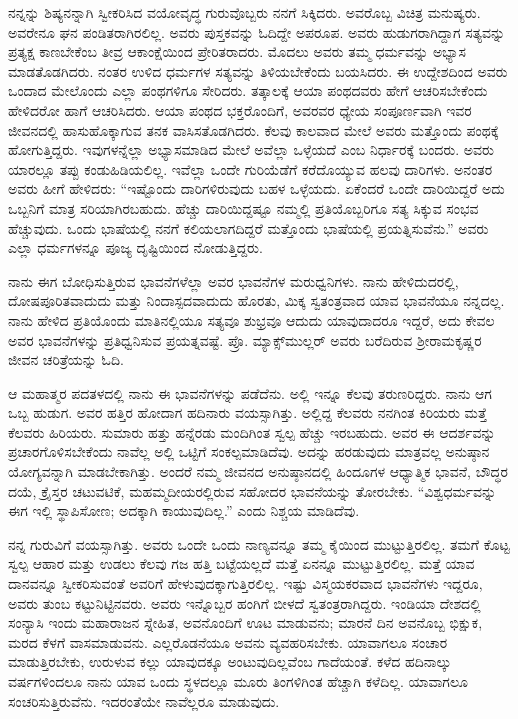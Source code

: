 ನನ್ನನ್ನು ಶಿಷ್ಯನನ್ನಾಗಿ ಸ್ವೀಕರಿಸಿದ ವಯೋವೃದ್ಧ ಗುರುವೊಬ್ಬರು ನನಗೆ ಸಿಕ್ಕಿದರು. ಅವರೊಬ್ಬ ವಿಚಿತ್ರ ಮನುಷ್ಯರು. ಅವರೇನೂ ಘನ ಪಂಡಿತರಾಗಿರಲಿಲ್ಲ. ಅವರು ಪುಸ್ತಕವನ್ನು ಓದಿದ್ದೇ ಅಪರೂಪ. ಅವರು ಹುಡುಗರಾಗಿದ್ದಾಗ ಸತ್ಯವನ್ನು ಪ್ರತ್ಯಕ್ಷ ಕಾಣಬೇಕೆಂಬ ತೀವ್ರ ಆಕಾಂಕ್ಷೆಯಿಂದ ಪ್ರೇರಿತರಾದರು. ಮೊದಲು ಅವರು ತಮ್ಮ ಧರ್ಮವನ್ನು ಅಭ್ಯಾಸ ಮಾಡತೊಡಗಿದರು. ನಂತರ ಉಳಿದ ಧರ್ಮಗಳ ಸತ್ಯವನ್ನು ತಿಳಿಯಬೇಕೆಂದು ಬಯಸಿದರು. ಈ ಉದ್ದೇಶದಿಂದ ಅವರು ಒಂದಾದ ಮೇಲೊಂದು ಎಲ್ಲಾ ಪಂಥಗಳಿಗೂ ಸೇರಿದರು. ತತ್ಕಾಲಕ್ಕೆ ಆಯಾ ಪಂಥದವರು ಹೇಗೆ ಆಚರಿಸಬೇಕೆಂದು ಹೇಳಿದರೋ ಹಾಗೆ ಆಚರಿಸಿದರು. ಆಯಾ ಪಂಥದ ಭಕ್ತರೊಂದಿಗೆ, ಅವರವರ ಧ್ಯೇಯ ಸಂಪೂರ್ಣವಾಗಿ ಇವರ ಜೀವನದಲ್ಲಿ ಹಾಸುಹೊಕ್ಕಾಗುವ ತನಕ ವಾಸಿಸತೊಡಗಿದರು. ಕೆಲವು ಕಾಲವಾದ ಮೇಲೆ ಅವರು ಮತ್ತೊಂದು ಪಂಥಕ್ಕೆ ಹೋಗುತ್ತಿದ್ದರು. ಇವುಗಳನ್ನೆಲ್ಲಾ ಅಭ್ಯಾಸಮಾಡಿದ ಮೇಲೆ ಅವೆಲ್ಲಾ ಒಳ್ಳೆಯದೆ ಎಂಬ ನಿರ್ಧಾರಕ್ಕೆ ಬಂದರು. ಅವರು ಯಾರಲ್ಲೂ ತಪ್ಪು ಕಂಡುಹಿಡಿಯಲಿಲ್ಲ. ಇವೆಲ್ಲಾ ಒಂದೇ ಗುರಿಯೆಡೆಗೆ ಕರೆದೊಯ್ಯುವ ಹಲವು ದಾರಿಗಳು. ಅನಂತರ ಅವರು ಹೀಗೆ ಹೇಳಿದರು: “ಇಷ್ಟೊಂದು ದಾರಿಗಳಿರುವುದು ಬಹಳ ಒಳ್ಳೆಯದು. ಏಕೆಂದರೆ ಒಂದೇ ದಾರಿಯಿದ್ದರೆ ಅದು ಒಬ್ಬನಿಗೆ ಮಾತ್ರ ಸರಿಯಾಗಿರಬಹುದು. ಹೆಚ್ಚು ದಾರಿಯಿದ್ದಷ್ಟೂ ನಮ್ಮಲ್ಲಿ ಪ್ರತಿಯೊಬ್ಬರಿಗೂ ಸತ್ಯ ಸಿಕ್ಕುವ ಸಂಭವ ಹೆಚ್ಚುವುದು. ಒಂದು ಭಾಷೆಯಲ್ಲಿ ನನಗೆ ಕಲಿಯಲಾಗದಿದ್ದರೆ ಮತ್ತೊಂದು ಭಾಷೆಯಲ್ಲಿ ಪ್ರಯತ್ನಿಸುವೆನು.” ಅವರು ಎಲ್ಲಾ ಧರ್ಮಗಳನ್ನೂ ಪೂಜ್ಯ ದೃಷ್ಟಿಯಿಂದ ನೋಡುತ್ತಿದ್ದರು.

ನಾನು ಈಗ ಬೋಧಿಸುತ್ತಿರುವ ಭಾವನೆಗಳೆಲ್ಲಾ ಅವರ ಭಾವನೆಗಳ ಮರುಧ್ವನಿಗಳು. ನಾನು ಹೇಳಿದುದರಲ್ಲಿ, ದೋಷಪೂರಿತವಾದುದು ಮತ್ತು ನಿಂದಾಸ್ಪದವಾದುದು ಹೊರತು, ಮಿಕ್ಕ ಸ್ವತಂತ್ರವಾದ ಯಾವ ಭಾವನೆಯೂ ನನ್ನದಲ್ಲ. ನಾನು ಹೇಳಿದ ಪ್ರತಿಯೊಂದು ಮಾತಿನಲ್ಲಿಯೂ ಸತ್ಯವೂ ಶುಭ್ರವೂ ಆದುದು ಯಾವುದಾದರೂ ಇದ್ದರೆ, ಅದು ಕೇವಲ ಅವರ ಭಾವನೆಗಳನ್ನು ಪ್ರತಿಧ್ವನಿಸುವ ಪ್ರಯತ್ನವಷ್ಟೆ. ಪ್ರೊ. ಮ್ಯಾಕ್ಸ್‌ಮುಲ್ಲರ್ ಅವರು ಬರೆದಿರುವ ಶ‍್ರೀರಾಮಕೃಷ್ಣರ ಜೀವನ ಚರಿತ್ರೆಯನ್ನು ಓದಿ.

ಆ ಮಹಾತ್ಮರ ಪದತಳದಲ್ಲಿ ನಾನು ಈ ಭಾವನೆಗಳನ್ನು ಪಡೆದೆನು. ಅಲ್ಲಿ ಇನ್ನೂ ಕೆಲವು ತರುಣರಿದ್ದರು. ನಾನು ಆಗ ಒಬ್ಬ ಹುಡುಗ. ಅವರ ಹತ್ತಿರ ಹೋದಾಗ ಹದಿನಾರು ವಯಸ್ಸಾಗಿತ್ತು. ಅಲ್ಲಿದ್ದ ಕೆಲವರು ನನಗಿಂತ ಕಿರಿಯರು ಮತ್ತೆ ಕೆಲವರು ಹಿರಿಯರು. ಸುಮಾರು ಹತ್ತು ಹನ್ನೆರಡು ಮಂದಿಗಿಂತ ಸ್ವಲ್ಪ ಹೆಚ್ಚು ಇರಬಹುದು. ಅವರ ಈ ಆದರ್ಶವನ್ನು ಪ್ರಚಾರಗೊಳಿಸಬೇಕೆಂದು ನಾವೆಲ್ಲ ಅಲ್ಲಿ ಒಟ್ಟಿಗೆ ಸಂಕಲ್ಪಮಾಡಿದೆವು. ಅದನ್ನು ಹರಡುವುದು ಮಾತ್ರವಲ್ಲ ಅನುಷ್ಠಾನ ಯೋಗ್ಯವನ್ನಾಗಿ ಮಾಡಬೇಕಾಗಿತ್ತು. ಅಂದರೆ ನಮ್ಮ ಜೀವನದ ಅನುಷ್ಠಾನದಲ್ಲಿ ಹಿಂದೂಗಳ ಆಧ್ಯಾತ್ಮಿಕ ಭಾವನೆ, ಬೌದ್ಧರ ದಯೆ, ಕ್ರೈಸ್ತರ ಚಟುವಟಿಕೆ, ಮಹಮ್ಮದೀಯರಲ್ಲಿರುವ ಸಹೋದರ ಭಾವನೆಯನ್ನು ತೋರಬೇಕು. “ವಿಶ್ವಧರ್ಮವನ್ನು ಈಗ ಇಲ್ಲಿ ಸ್ಥಾಪಿಸೋಣ; ಅದಕ್ಕಾಗಿ ಕಾಯುವುದಿಲ್ಲ.” ಎಂದು ನಿಶ್ಚಯ ಮಾಡಿದೆವು.

ನನ್ನ ಗುರುವಿಗೆ ವಯಸ್ಸಾಗಿತ್ತು. ಅವರು ಒಂದೇ ಒಂದು ನಾಣ್ಯವನ್ನೂ ತಮ್ಮ ಕೈಯಿಂದ ಮುಟ್ಟುತ್ತಿರಲಿಲ್ಲ. ತಮಗೆ ಕೊಟ್ಟ ಸ್ವಲ್ಪ ಆಹಾರ ಮತ್ತು ಉಡಲು ಕೆಲವು ಗಜ ಹತ್ತಿ ಬಟ್ಟೆಯಲ್ಲದೆ ಮತ್ತೆ ಏನನ್ನೂ ಮುಟ್ಟುತ್ತಿರಲಿಲ್ಲ. ಮತ್ತೆ ಯಾವ ದಾನವನ್ನೂ ಸ್ವೀಕರಿಸುವಂತೆ ಅವರಿಗೆ ಹೇಳುವುದಕ್ಕಾಗುತ್ತಿರಲಿಲ್ಲ. ಇಷ್ಟು ವಿಸ್ಮಯಕರವಾದ ಭಾವನೆಗಳು ಇದ್ದರೂ, ಅವರು ತುಂಬ ಕಟ್ಟುನಿಟ್ಟಿನವರು. ಅವರು ಇನ್ನೊಬ್ಬರ ಹಂಗಿಗೆ ಬೀಳದೆ ಸ್ವತಂತ್ರರಾಗಿದ್ದರು. ಇಂಡಿಯಾ ದೇಶದಲ್ಲಿ ಸಂನ್ಯಾಸಿ ಇಂದು ಮಹಾರಾಜನ ಸ್ನೇಹಿತ, ಅವನೊಂದಿಗೆ ಊಟ ಮಾಡುವನು; ಮಾರನೆ ದಿನ ಅವನೊಬ್ಬ ಭಿಕ್ಷುಕ, ಮರದ ಕೆಳಗೆ ವಾಸಮಾಡುವನು. ಎಲ್ಲರೊಡನೆಯೂ ಅವನು ವ್ಯವಹರಿಸಬೇಕು. ಯಾವಾಗಲೂ ಸಂಚಾರ ಮಾಡುತ್ತಿರಬೇಕು, ಉರುಳುವ ಕಲ್ಲು ಯಾವುದಕ್ಕೂ ಅಂಟುವುದಿಲ್ಲವೆಂಬ ಗಾದೆಯಂತೆ. ಕಳೆದ ಹದಿನಾಲ್ಕು ವರ್ಷಗಳಿಂದಲೂ ನಾನು ಯಾವ ಒಂದು ಸ್ಥಳದಲ್ಲೂ ಮೂರು ತಿಂಗಳಿಗಿಂತ ಹೆಚ್ಚಾಗಿ ಕಳೆದಿಲ್ಲ. ಯಾವಾಗಲೂ ಸಂಚರಿಸುತ್ತಿರುವೆನು. ಇದರಂತೆಯೇ ನಾವೆಲ್ಲರೂ ಮಾಡುವುದು.

